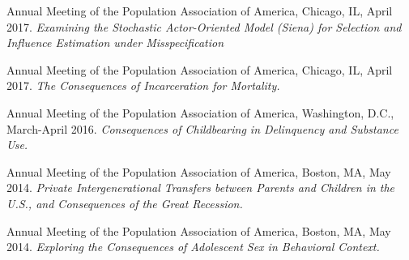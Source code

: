 \documentclass[10pt,letterpaper]{article}
\renewenvironment{itemize}{
  \begin{list}{}{
    \setlength{\leftmargin}{1.5em}
    \setlength{\itemsep}{0.25em}
    \setlength{\parskip}{0pt}
    \setlength{\parsep}{0.25em}
  }
}{
  \end{list}
}
\begin{document}
\begin{itemize}
\item  Annual Meeting of the Population Association of America, Chicago, IL, April 2017. {\textit{Examining the Stochastic Actor-Oriented Model (Siena) for Selection and Influence Estimation under Misspecification}}

\item  Annual Meeting of the Population Association of America, Chicago, IL, April 2017. {\textit{The Consequences of Incarceration for Mortality.}}

\item  Annual Meeting of the Population Association of America, Washington, D.C., March-April 2016. {\textit{Consequences of Childbearing in Delinquency and Substance Use.}}

\item  Annual Meeting of the Population Association of America, Boston, MA, May 2014. {\textit{Private Intergenerational Transfers between Parents and Children in the U.S., and Consequences of the Great Recession.}}

\item  Annual Meeting of the Population Association of America, Boston, MA, May 2014. {\textit{Exploring the Consequences of Adolescent Sex in Behavioral Context.}}






\end{itemize}
\end{document}
